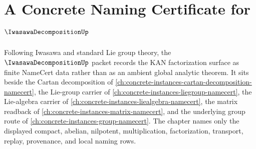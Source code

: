 \chapter{A Concrete Naming Certificate for $\IwasawaDecompositionUp$}
\label{ch:concrete-instances-iwasawa-decomposition-namecert}

Following Iwasawa and standard Lie group theory, the $\IwasawaDecompositionUp$ packet records the KAN factorization surface as finite NameCert data rather than as an ambient global analytic theorem. It sits beside the Cartan decomposition of \autoref{ch:concrete-instances-cartan-decomposition-namecert}, the Lie-group carrier of \autoref{ch:concrete-instances-liegroup-namecert}, the Lie-algebra carrier of \autoref{ch:concrete-instances-liealgebra-namecert}, the matrix readback of \autoref{ch:concrete-instances-matrix-namecert}, and the underlying group route of \autoref{ch:concrete-instances-group-namecert}. The chapter names only the displayed compact, abelian, nilpotent, multiplication, factorization, transport, replay, provenance, and local naming rows.

